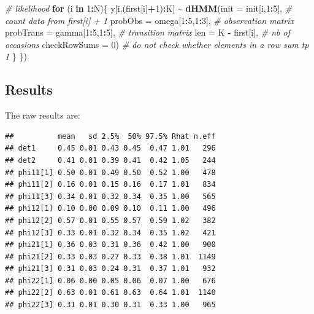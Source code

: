\documentclass[
  12pt,
]{krantz}
\newenvironment{Shaded}{\begin{snugshade}}{\end{snugshade}}
\newcommand{\AttributeTok}[1]{\textcolor[rgb]{0.13,0.29,0.53}{#1}}
\newcommand{\CommentTok}[1]{\textcolor[rgb]{0.56,0.35,0.01}{\textit{#1}}}
\newcommand{\ControlFlowTok}[1]{\textcolor[rgb]{0.13,0.29,0.53}{\textbf{#1}}}
\newcommand{\DecValTok}[1]{\textcolor[rgb]{0.00,0.00,0.81}{#1}}
\newcommand{\FunctionTok}[1]{\textcolor[rgb]{0.13,0.29,0.53}{\textbf{#1}}}
\newcommand{\NormalTok}[1]{#1}
\newcommand{\SpecialCharTok}[1]{\textcolor[rgb]{0.81,0.36,0.00}{\textbf{#1}}}
\begin{document}
\begin{Shaded}
\begin{Highlighting}[]
  \CommentTok{\# likelihood }
  \ControlFlowTok{for}\NormalTok{ (i }\ControlFlowTok{in} \DecValTok{1}\SpecialCharTok{:}\NormalTok{N)\{}
\NormalTok{    y[i,(first[i]}\SpecialCharTok{+}\DecValTok{1}\NormalTok{)}\SpecialCharTok{:}\NormalTok{K] }\SpecialCharTok{\textasciitilde{}} \FunctionTok{dHMM}\NormalTok{(}\AttributeTok{init =}\NormalTok{ init[i,}\DecValTok{1}\SpecialCharTok{:}\DecValTok{5}\NormalTok{],           }\CommentTok{\# count data from first[i] + 1}
                               \AttributeTok{probObs =}\NormalTok{ omega[}\DecValTok{1}\SpecialCharTok{:}\DecValTok{5}\NormalTok{,}\DecValTok{1}\SpecialCharTok{:}\DecValTok{3}\NormalTok{],     }\CommentTok{\# observation matrix}
                               \AttributeTok{probTrans =}\NormalTok{ gamma[}\DecValTok{1}\SpecialCharTok{:}\DecValTok{5}\NormalTok{,}\DecValTok{1}\SpecialCharTok{:}\DecValTok{5}\NormalTok{],   }\CommentTok{\# transition matrix}
                               \AttributeTok{len =}\NormalTok{ K }\SpecialCharTok{{-}}\NormalTok{ first[i],           }\CommentTok{\# nb of occasions}
                               \AttributeTok{checkRowSums =} \DecValTok{0}\NormalTok{)             }\CommentTok{\# do not check whether elements in a row sum tp 1}
\NormalTok{  \}}
\NormalTok{\})}
\end{Highlighting}
\end{Shaded}

\subsection{Results}\label{results-4}

The raw results are:

\begin{verbatim}
##          mean   sd 2.5%  50% 97.5% Rhat n.eff
## det1     0.45 0.01 0.43 0.45  0.47 1.01   296
## det2     0.41 0.01 0.39 0.41  0.42 1.05   244
## phi11[1] 0.50 0.01 0.49 0.50  0.52 1.00   478
## phi11[2] 0.16 0.01 0.15 0.16  0.17 1.01   834
## phi11[3] 0.34 0.01 0.32 0.34  0.35 1.00   565
## phi12[1] 0.10 0.00 0.09 0.10  0.11 1.00   496
## phi12[2] 0.57 0.01 0.55 0.57  0.59 1.02   382
## phi12[3] 0.33 0.01 0.32 0.34  0.35 1.02   421
## phi21[1] 0.36 0.03 0.31 0.36  0.42 1.00   900
## phi21[2] 0.33 0.03 0.27 0.33  0.38 1.01  1149
## phi21[3] 0.31 0.03 0.24 0.31  0.37 1.01   932
## phi22[1] 0.06 0.00 0.05 0.06  0.07 1.00   676
## phi22[2] 0.63 0.01 0.61 0.63  0.64 1.01  1140
## phi22[3] 0.31 0.01 0.30 0.31  0.33 1.00   965
\end{verbatim}
\end{document}
